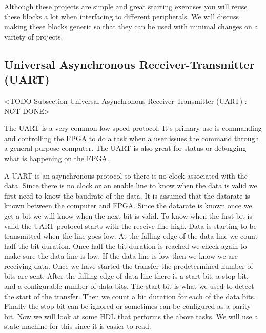 Although these projects are simple and great starting exercises you will reuse these blocks a lot when interfacing to different peripherals. We will discuss making these blocks generic so that they can be used with minimal changes on a variety of projects.

\subsection{Universal Asynchronous Receiver-Transmitter (UART)}
	<TODO Subsection Universal Asynchronous Receiver-Transmitter (UART) : NOT DONE>
	
The \ac{UART} is a very common low speed protocol. It's primary use is commanding and controlling the FPGA to do a task when a user issues the command through a general purpose computer. The \ac{UART} is also great for status or debugging what is happening on the \ac{FPGA}.

A \ac{UART} is an asynchronous protocol so there is no clock associated with the data. Since there is no clock or an enable line to know when the data is valid we first need to know the baudrate of the data. It is assumed that the datarate is known between the computer and \ac{FPGA}. Since the datarate is known once we get a bit we will know when the next bit is valid. To know when the first bit is valid the \ac{UART} protocol starts with the receive line high. Data is starting to be transmitted when the line goes low. At the falling edge of the data line we count half the bit duration. Once half the bit duration is reached we check again to make sure the data line is low. If the data line is low then we know we are receiving data. Once we have started the transfer the predetermined number of bits are sent. After the falling edge of data line there is a start bit, a stop bit, and a configurable number of data bits. The start bit is what we used to detect the start of the transfer. Then we count a bit duration for each of the data bits. Finally the stop bit can be ignored or sometimes can be configured as a parity bit.  Now we will look at some \ac{HDL} that performs the above tasks. We will use a state machine for this since it is easier to read. 

	
	
